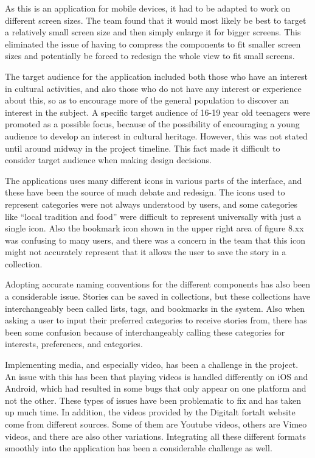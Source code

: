 As this is an application for mobile devices, it had to be adapted to work on different screen sizes. The team found that it would most likely be best to target a relatively small screen size and then simply enlarge it for bigger screens. This eliminated the issue of having to compress the components to fit smaller screen sizes and potentially be forced to redesign the whole view to fit small screens.\newline

The target audience for the application included both those who have an interest in cultural activities, and also those who do not have any interest or experience about this, so as to encourage more of the general population to discover an interest in the subject. A specific target audience of 16-19 year old teenagers were promoted as a possible focus, because of the possibility of encouraging a young audience to develop an interest in cultural heritage. However, this was not stated until around  midway in the project timeline. This fact made it difficult to consider target audience when making design decisions. \newline

The applications uses many different icons in various parts of the interface, and these have been the source of much debate and redesign. The icons used to represent categories were not always understood by users, and some categories like “local tradition and food” were difficult to represent universally with just a single icon. Also the bookmark icon shown in the upper right area of figure 8.xx was confusing to many users, and there was a concern in the team that this icon might not accurately represent that it allows the user to save the story in a collection.\newline

Adopting accurate naming conventions for the different components has also been a considerable issue. Stories can be saved in collections, but these collections have interchangeably been called lists, tags, and bookmarks in the system. Also when asking a user to input their preferred categories to receive stories from, there has been some confusion because of interchangeably calling these categories for interests,  preferences, and categories.\newline

Implementing media, and especially video, has been a challenge in the project. An issue with this has been that playing videos is handled differently on iOS and Android, which had resulted in some bugs that only appear on one platform and not the other. These types of issues have been problematic to fix and has taken up much time. In addition, the videos provided by the Digitalt fortalt website come from different sources. Some of them are Youtube videos, others are Vimeo videos, and there are also other variations. Integrating all these different formats smoothly into the application has been a considerable challenge as well. \newline

